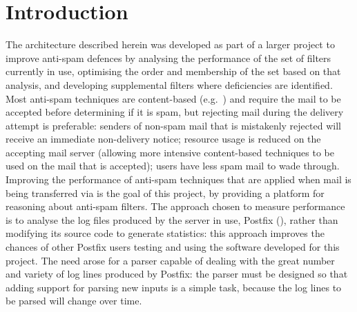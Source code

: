 \chapter{Introduction}

\label{introduction}

The architecture described herein was developed as part of a larger project
to improve anti-spam defences by analysing the performance of the set of
filters currently in use, optimising the order and membership of the set
based on that analysis, and developing supplemental filters where
deficiencies are identified.  Most anti-spam techniques are content-based
(e.g.~\cite{a-plan-for-spam, word-stemming, relaxed-online-svms}) and
require the mail to be accepted before determining if it is spam, but
rejecting mail during the delivery attempt is preferable: senders of
non-spam mail that is mistakenly rejected will receive an immediate
non-delivery notice; resource usage is reduced on the accepting mail server
(allowing more intensive content-based techniques to be used on the mail
that is accepted); users have less spam mail to wade through.  Improving
the performance of anti-spam techniques that are applied when mail is being
transferred via  is the goal of this project, by providing a
platform for reasoning about anti-spam filters.  The approach chosen to
measure performance is to analyse the log files produced by the
 server in use, Postfix
(), rather than
modifying its source code to generate statistics: this approach improves
the chances of other Postfix users testing and using the software developed
for this project.  The need arose for a parser capable of dealing with the
great number and variety of log lines produced by Postfix: the parser must
be designed so that adding support for parsing new inputs is a simple task,
because the log lines to be parsed will change over time.

